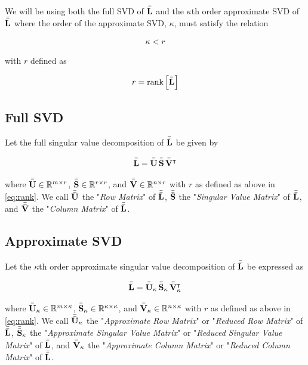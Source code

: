 \documentclass[../ClusteringConnectionsMAIN.tex]{subfiles}
\begin{document}
\begin{flushleft}
\begin{large}

We will be using both the full SVD of $\bar{\bar{\mathbf{L}}}$ and the $\kappa$th order approximate SVD of $\bar{\bar{\mathbf{L}}}$ where the order of the approximate SVD, $\kappa$, must satisfy the relation

\begin{align*}
\kappa < r
\end{align*} 

with $r$ defined as

\begin{align} 
r = \text{rank} \left[ \bar{\bar{\mathbf{L}}} \right] \label{eq:rank}
\end{align}


\subsection{Full SVD}

Let the full singular value decomposition of $\bar{\bar{\mathbf{L}}}$ be given by

\begin{align*}
\bar{\bar{\mathbf{L}}} = \bar{\bar{\mathbf{U}}} \, \bar{\bar{\mathbf{S}}} \, \bar{\bar{\mathbf{V}}}^\intercal
\end{align*}

where $\bar{\bar{\mathbf{U}}} \in \mathbb{R}^{m \times r}$, $\bar{\bar{\mathbf{S}}} \in \mathbb{R}^{r \times r}$, and $\bar{\bar{\mathbf{V}}} \in \mathbb{R}^{n \times r}$ with $r$ as defined as above in \ref{eq:rank}.  We call $\bar{\bar{\mathbf{U}}}$ the "\emph{Row Matrix}" of $\bar{\bar{\mathbf{L}}}$, $\bar{\bar{\mathbf{S}}}$ the "\emph{Singular Value Matrix}" of $\bar{\bar{\mathbf{L}}}$, and $\bar{\bar{\mathbf{V}}}$ the "\emph{Column Matrix}" of $\bar{\bar{\mathbf{L}}}$.


\subsection{Approximate SVD}

Let the $\kappa$th order approximate singular value decomposition of $\bar{\bar{\mathbf{L}}}$ be expressed as

\begin{align*}
\bar{\bar{\mathbf{L}}} = \bar{\bar{\mathbf{U}}}_\kappa \, \bar{\bar{\mathbf{S}}}_\kappa \, \bar{\bar{\mathbf{V}}}_\kappa^\intercal
\end{align*}

where $\bar{\bar{\mathbf{U}}}_\kappa \in \mathbb{R}^{m \times \kappa}$, $\bar{\bar{\mathbf{S}}}_\kappa \in \mathbb{R}^{\kappa \times \kappa}$, and $\bar{\bar{\mathbf{V}}}_\kappa \in \mathbb{R}^{n \times \kappa}$ with $r$ as defined as above in \ref{eq:rank}.  We call $\bar{\bar{\mathbf{U}}}_\kappa$ the "\emph{Approximate Row Matrix}" or "\emph{Reduced Row Matrix}" of $\bar{\bar{\mathbf{L}}}$, $\bar{\bar{\mathbf{S}}}_\kappa$ the "\emph{Approximate Singular Value Matrix}" or "\emph{Reduced Singular Value Matrix}" of $\bar{\bar{\mathbf{L}}}$, and $\bar{\bar{\mathbf{V}}}_\kappa$ the "\emph{Approximate Column Matrix}" or "\emph{Reduced Column Matrix}" of $\bar{\bar{\mathbf{L}}}$.


\end{large}
\end{flushleft}
\end{document}
